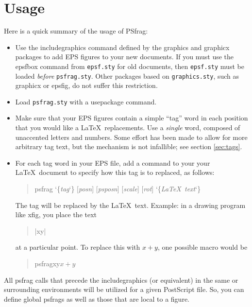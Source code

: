 \documentclass[11pt]{ltxguide}
\let\pkg\textsf
\let\fname\texttt
\newcommand{\pfg}{\pkg{PSfrag}}
\def\cs#1{%
  {\ttfamily\expandafter\string\csname #1\endcsname}}
\providecommand\marg[1]{%
  {\ttfamily\char`\{}{\em#1\/}{\ttfamily\char`\}}}
\providecommand\oarg[1]{%
  {\ttfamily[}{\em #1\/}{\ttfamily]}}
\begin{document}
\section{Usage}
Here is a quick summary of the usage of \pfg:
\begin{itemize}

\item Use the \cs{includegraphics} command defined by the \pkg{graphics}
      and \pkg{graphicx} packages to add EPS figures to your new documents.
	  If you must use the \cs{epsfbox} command from \fname{epsf.sty} for
	  old documents, then \fname{epsf.sty} must be loaded \emph{before}
	  \fname{psfrag.sty}. Other packages based on \fname{graphics.sty},
	  such as \pkg{graphicx} or \pkg{epsfig}, do not suffer this restriction.

\item Load \fname{psfrag.sty} with a \cs{usepackage} command.

\item Make sure that your EPS figures contain a simple ``tag'' word in
	  each position that you would like a \LaTeX\ replacements. Use
	  a \emph{single} word, composed of unaccented letters and numbers. 
	  Some effort has been made to allow for more arbitrary tag text, 
	  but the mechanism is not infallible; see section \ref{sec:tags}.

\item For each tag word in your EPS file, add a command to your
	  your \LaTeX\ document to specify how this tag is to replaced,
	  as follows:
\begin{quote}
    \cs{psfrag}\marg{tag}\oarg{posn}\oarg{psposn}%
    \oarg{scale}\oarg{rot}\marg{\LaTeX\ text}
\end{quote}
	 The tag will be replaced by the \LaTeX\ text.
	Example: in a drawing program like \pkg{xfig}, you place the text
	\begin{quote}
	    |xy|
	\end{quote}
	at a particular point. To replace this with $x+y$, one possible
	macro would be
	\begin{quote}
	    \cs{psfrag{xy}{$x+y$}}
	\end{quote}
\end{itemize}

All \cs{psfrag} calls that precede the \cs{includegraphics} (or
equivalent) in the same or surrounding environments will be utilized
for a given PostScript file. So, you can define global \cs{psfrag}s as
well as those that are local to a figure.
\end{document}
